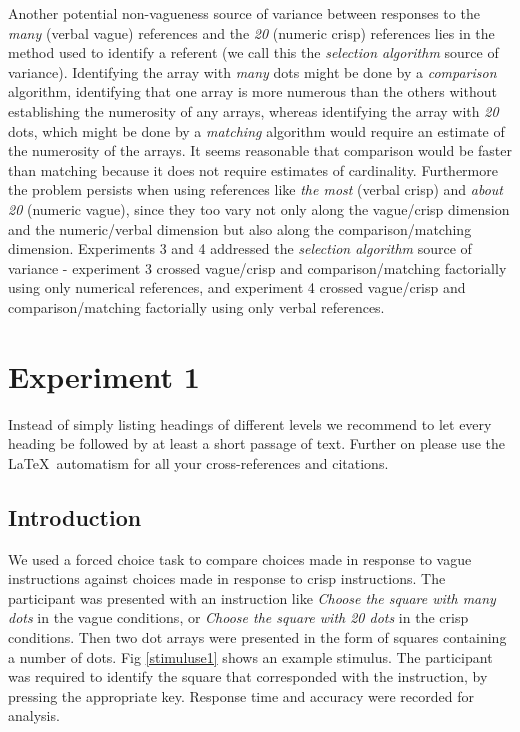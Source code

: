 \documentclass[graybox,envcountchap,sectrefs%
,footinfo
]{svmono}
\begin{document}
Another potential non-vagueness source of variance between responses to the \emph{many} (verbal vague) references and the \emph{20} (numeric crisp) references lies in the method used to identify a referent (we call this the {\sl selection algorithm} source of variance). Identifying the array with \emph{many} dots might be done by a \emph{comparison} algorithm, identifying that one array is more numerous than the others without establishing the numerosity of any arrays, whereas identifying the array with \emph{20} dots, which might be done by a \emph{matching} algorithm would require an estimate of the numerosity of the arrays. It seems reasonable that comparison would be faster than matching because it does not require estimates of cardinality. Furthermore the problem persists when using references like \emph{the most} (verbal crisp) and \emph{about 20} (numeric vague), since they too vary not only along the vague/crisp dimension and the numeric/verbal dimension but also along the comparison/matching dimension. Experiments 3 and 4 addressed the \emph{selection algorithm} source of variance - experiment 3 crossed vague/crisp and comparison/matching factorially using only numerical references, and experiment 4 crossed vague/crisp and comparison/matching factorially using only verbal references.  

\section{Experiment 1}
\label{sec:2}
Instead of simply listing headings of different levels we recommend to let every heading be followed by at least a short passage of text. Further on please use the \LaTeX\ automatism for all your cross-references and citations.

\subsection{Introduction}%
We used a forced choice task to compare choices made in response to vague instructions against choices made in response to crisp instructions. The participant was presented with an instruction like \emph{Choose the square with many dots} in the vague conditions, or \emph{Choose the square with 20 dots} in the crisp conditions. Then two dot arrays were presented in the form of squares containing a number of dots. Fig \ref{stimuluse1} shows an example stimulus. The participant was required to identify the square that corresponded with the instruction, by pressing the appropriate key.
Response time and accuracy were recorded for analysis. 
\end{document}
